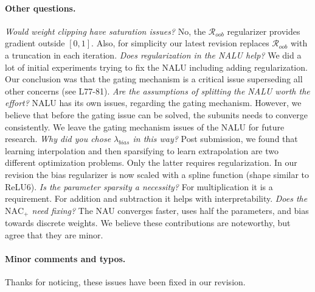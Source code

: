 \documentclass{article}
\begin{document}
\vspace{-0.3cm} \paragraph{Other questions.} \textit{Would weight clipping have saturation issues?} No, the $\mathcal{R}_{oob}$ regularizer provides gradient outside $[0,1]$. Also, for simplicity our latest revision replaces $\mathcal{R}_{oob}$ with a truncation in each iteration.
\textit{Does regularization in the NALU help?}
We did a lot of initial experiments trying to fix the NALU including adding regularization. Our conclusion was that the gating mechanism is a critical issue superseding all other concerns (see L77-81).
\textit{Are the assumptions of splitting the NALU worth the effort?} NALU has its own issues, regarding the gating mechanism. However, we believe that before the gating issue can be solved, the subunits needs to converge consistently.
We leave the gating mechanism issues of the NALU for future research.
\textit{Why did you chose $\lambda_{bias}$ in this way?} Post submission, we found that learning interpolation and then sparsifying to learn extrapolation are two different optimization problems. Only the latter requires regularization. In our revision the bias regularizer is now scaled with a spline function (shape similar to ReLU6).
\textit{Is the parameter sparsity a necessity?} For multiplication it is a requirement. For addition and subtraction it helps with interpretability. 
\textit{Does the $\mathrm{NAC}_{+}$ need fixing?} The NAU converges faster, uses half the parameters, and bias towards discrete weights. We believe these contributions are noteworthy, but agree that they are minor.

\vspace{-0.3cm} \paragraph{Minor comments and typos.} Thanks for noticing, these issues have been fixed in our revision.

\end{document}

